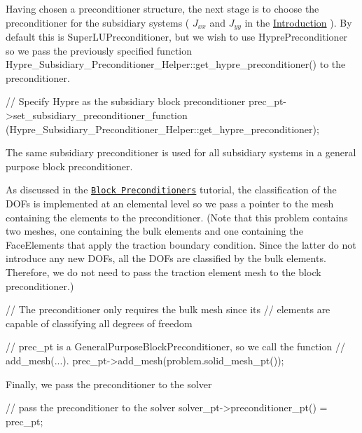 Having chosen a preconditioner structure, the next stage is to choose the preconditioner for the subsidiary systems ( $J_{xx}$ and $J_{yy}$ in the \hyperlink{index_introduction}{Introduction} ). By default this is {\ttfamily Super\+L\+U\+Preconditioner}, but we wish to use {\ttfamily Hypre\+Preconditioner} so we pass the previously specified function {\ttfamily Hypre\+\_\+\+Subsidiary\+\_\+\+Preconditioner\+\_\+\+Helper\+::get\+\_\+hypre\+\_\+preconditioner()} to the preconditioner.

 
\begin{DoxyCodeInclude}
 \textcolor{comment}{// Specify Hypre as the subsidiary block preconditioner}
 prec\_pt->set\_subsidiary\_preconditioner\_function
   (Hypre\_Subsidiary\_Preconditioner\_Helper::get\_hypre\_preconditioner);

\end{DoxyCodeInclude}


The same subsidiary preconditioner is used for all subsidiary systems in a general purpose block preconditioner.

As discussed in the \href{../../../mpi/block_preconditioners/html/index.html}{\tt Block Preconditioners} tutorial, the classification of the D\+O\+Fs is implemented at an elemental level so we pass a pointer to the mesh containing the elements to the preconditioner. (Note that this problem contains two meshes, one containing the bulk elements and one containing the Face\+Elements that apply the traction boundary condition. Since the latter do not introduce any new D\+O\+Fs, all the D\+O\+Fs are classified by the bulk elements. Therefore, we do not need to pass the traction element mesh to the block preconditioner.)

 
\begin{DoxyCodeInclude}
 \textcolor{comment}{// The preconditioner only requires the bulk mesh since its}
 \textcolor{comment}{// elements are capable of classifying all degrees of freedom}
 
 \textcolor{comment}{// prec\_pt is a GeneralPurposeBlockPreconditioner, so we call the function}
 \textcolor{comment}{// add\_mesh(...). }
 prec\_pt->add\_mesh(problem.solid\_mesh\_pt());

\end{DoxyCodeInclude}


Finally, we pass the preconditioner to the solver

 
\begin{DoxyCodeInclude}
 \textcolor{comment}{// pass the preconditioner to the solver}
 solver\_pt->preconditioner\_pt() = prec\_pt;

\end{DoxyCodeInclude}


